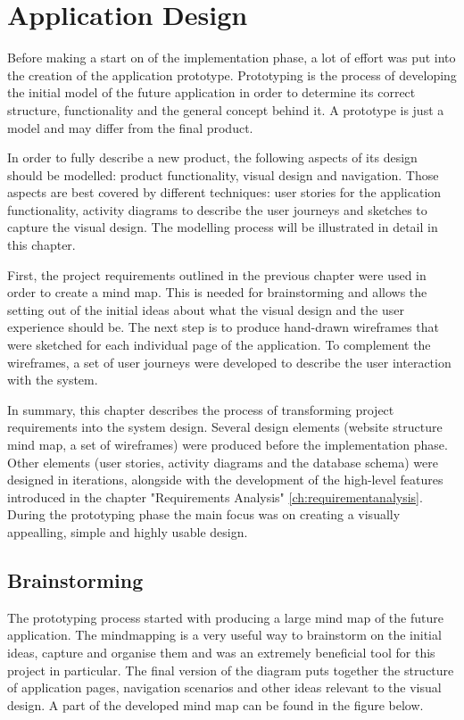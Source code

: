 \chapter{Application Design}
\label{ch:design}
Before making a start on of the implementation phase, a lot of effort was put into the creation of the application prototype. Prototyping is the process of developing the initial model of the future application in order to determine its correct structure, functionality and the general concept behind it. A prototype is just a model and may differ from the final product.

In order to fully describe a new product, the following aspects of its design should be modelled: product functionality, visual design and navigation. Those aspects are best covered by different techniques: user stories for the application functionality, activity diagrams to describe the user journeys and sketches to capture the visual design. The modelling process will be illustrated in detail in this chapter. 

First, the project requirements outlined in the previous chapter were used in order to create a mind map. This is needed for brainstorming and allows the setting out of the initial ideas about what the visual design and the user experience should be. The next step is to produce hand-drawn wireframes that were sketched for each individual page of the application. To complement the wireframes, a set of user journeys were developed to describe the user interaction with the system. 

In summary, this chapter describes the process of transforming project requirements into the system design. Several design elements (website structure mind map, a set of wireframes) were produced before the implementation phase. Other elements (user stories, activity diagrams and the database schema) were designed in iterations, alongside with the development of the high-level features introduced in the chapter "Requirements Analysis" \ref{ch:requirementanalysis}. During the prototyping phase the main focus was on creating a visually appealling, simple and highly usable design. 

\section{Brainstorming}
\label{sec:brainstorming_design}
The prototyping process started with producing a large mind map of the future application. The mindmapping is a very useful way to brainstorm on the initial ideas, capture and organise them and was an extremely beneficial tool for this project in particular. The final version of the diagram puts together the structure of application pages, navigation scenarios and other ideas relevant to the visual design. A part of the developed mind map can be found in the figure below.

